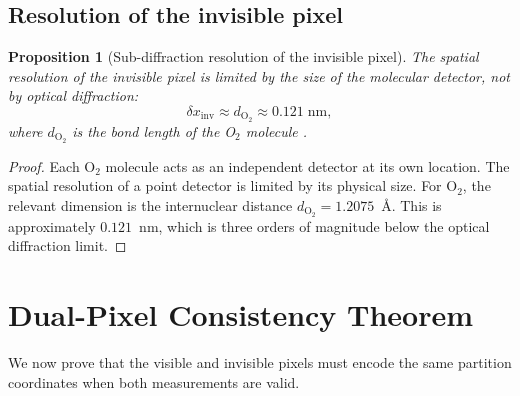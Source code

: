 \documentclass[11pt,twocolumn,a4paper]{article}
\newtheorem{proposition}[theorem]{Proposition}
\begin{document}
\subsection{Resolution of the invisible pixel}

\begin{proposition}[Sub-diffraction resolution of the invisible pixel]\label{prop:inv_resolution}
The spatial resolution of the invisible pixel is limited by the size of the molecular detector, not by optical diffraction:
\begin{equation}\label{eq:inv_resolution}
\delta x_{\mathrm{inv}} \approx d_{\mathrm{O}_2} \approx 0.121\;\text{nm},
\end{equation}
where $d_{\mathrm{O}_2}$ is the bond length of the O$_2$ molecule \citep{Huber1979}.
\end{proposition}
\begin{proof}
Each O$_2$ molecule acts as an independent detector at its own location.
The spatial resolution of a point detector is limited by its physical size.
For O$_2$, the relevant dimension is the internuclear distance $d_{\mathrm{O}_2} = 1.2075$~\AA.
This is approximately $0.121$~nm, which is three orders of magnitude below the optical diffraction limit.
\end{proof}



\section{Dual-Pixel Consistency Theorem}\label{sec:consistency}

We now prove that the visible and invisible pixels must encode the same partition coordinates when both measurements are valid.
\end{document}
